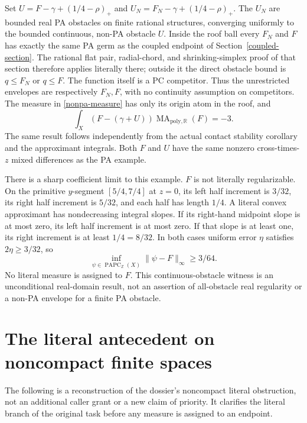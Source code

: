 \documentclass[11pt]{article}
\newcommand{\R}{\mathbb R}
\newcommand{\Z}{\mathbb Z}
\newcommand{\PAPC}{\operatorname{PAPC}}
\begin{document}
Set $U=F-\gamma+(1/4-\rho)_+$ and $U_N=F_N-\gamma+(1/4-\rho)_+$.
The $U_N$ are bounded real PA obstacles on finite rational structures,
converging uniformly to the bounded continuous, non-PA obstacle $U$.
Inside the roof ball every $F_N$ and $F$ has exactly the same PA germ
as the coupled endpoint of Section~\ref{coupled-section}. The rational
flat pair, radial-chord, and shrinking-simplex proof of that section
therefore applies literally there; outside it the direct obstacle
bound is $q\leq F_N$ or $q\leq F$. The function itself is a PC
competitor. Thus the unrestricted envelopes are respectively $F_N,F$,
with no continuity assumption on competitors. The measure in
\eqref{nonpa-measure} has only its origin atom in the roof, and
\[
 \int_X(F-(\gamma+U))\operatorname{MA}_{\mathrm{poly},\R}(F)=-3.
\]
The same result follows independently from the actual contact stability
corollary and the approximant integrals. Both $F$ and $U$ have the
same nonzero cross-times-$z$ mixed differences as the PA example.

There is a sharp coefficient limit to this example. $F$ is not literally
regularizable. On the primitive $y$-segment $[5/4,7/4]$ at $z=0$,
its left half increment is $3/32$, its right half increment is $5/32$,
and each half has length $1/4$. A literal convex approximant has
nondecreasing integral slopes. If its right-hand midpoint slope is
at most zero, its left half increment is at most zero. If that slope
is at least one, its right increment is at least $1/4=8/32$.
In both cases uniform error $\eta$ satisfies $2\eta\geq3/32$, so
\[
 \inf_{\psi\in\PAPC_\Z(X)}\|\psi-F\|_\infty\geq3/64.
\]
No literal measure is assigned to $F$. This continuous-obstacle witness
is an unconditional real-domain result, not an assertion of all-obstacle
real regularity or a non-PA envelope for a finite PA obstacle.

\section{The literal antecedent on noncompact finite spaces}\label{literal-section}
The following is a reconstruction of the dossier's noncompact literal
obstruction, not an additional caller grant or a new claim of priority.
It clarifies the literal branch of the original task before any measure
is assigned to an endpoint.
\end{document}

